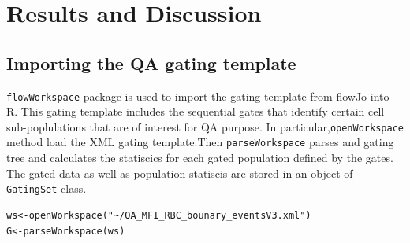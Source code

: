 \documentclass[10pt]{bmc_article}
\newenvironment{bmcformat}{\baselineskip20pt\sloppy\setboolean{publ}{false}}{\baselineskip20pt\sloppy}
\begin{document}
\begin{bmcformat}
% 

\section*{Results and Discussion}
\subsection{Importing the QA gating template}
\texttt{flowWorkspace} package is used to import the gating template
from flowJo into R. This gating template includes the sequential gates
that identify certain cell sub-poplulations that are of interest for QA purpose. 
In particular,\texttt{openWorkspace} method load the XML gating template.Then
\texttt{parseWorkspace} parses and gating tree and calculates the statiscics for
each gated population defined by the gates. The gated data as well as
population statiscis are stored in an object of \texttt{GatingSet} class.

\begin{verbatim}
ws<-openWorkspace("~/QA_MFI_RBC_bounary_eventsV3.xml")
G<-parseWorkspace(ws)
\end{verbatim}


\end{bmcformat}
\end{document}
